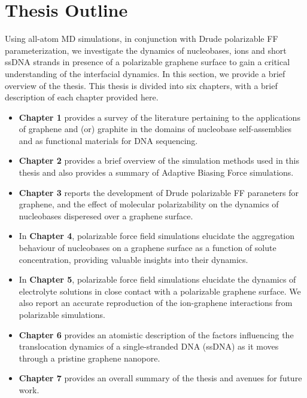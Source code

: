\section{Thesis Outline}
 Using all-atom MD simulations, in conjunction with Drude polarizable FF parameterization, we investigate the dynamics of nucleobases, ions and short ssDNA strands in presence of a polarizable graphene surface to gain a critical understanding of the interfacial dynamics. In this section, we provide a brief overview of the thesis. This thesis is divided into six chapters, with a brief description of each chapter provided here.

\begin{itemize}
    \item \textbf{Chapter 1} provides a survey of the literature pertaining to the applications of graphene and (or) graphite in the domains of nucleobase self-assemblies and as functional materials for DNA sequencing. 
    \item \textbf{Chapter 2} provides a brief overview of the simulation methods used in this thesis and also provides a summary of Adaptive Biasing Force simulations.
    \item \textbf{Chapter 3} reports the development of Drude polarizable FF paraneters for graphene, and the effect of molecular polarizability on the dynamics of nucleobases disperesed over a graphene surface.
    \item In \textbf{Chapter 4}, polarizable force field simulations elucidate the aggregation behaviour of nucleobases on a graphene surface as a function of solute concentration, providing valuable insights into their dynamics.
    \item In \textbf{Chapter 5}, polarizable force field simulations elucidate the dynamics of electrolyte solutions in close contact with a polarizable graphene surface. We also report an accurate reproduction of the ion-graphene interactions from polarizable simulations.  
    \item \textbf{Chapter 6} provides an atomistic description of the factors influencing the translocation dynamics of a single-stranded DNA (ssDNA) as it moves through a pristine graphene nanopore.
    \item \textbf{Chapter 7} provides an overall summary of the thesis and avenues for future work.
\end{itemize}


